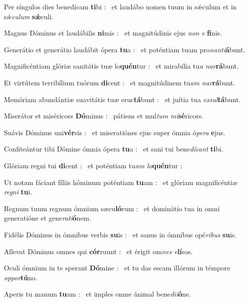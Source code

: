\documentclass[12pt]{article} %
\newenvironment{psalmtext}{\leftskip 0.25in}{\vspace{2 mm}}
\let\oldgresixstar\gresixstar
\renewcommand{\gresixstar}{\textcolor{benred8}{\oldgresixstar}}
\begin{document}
\begin{psalmtext}
Per síngulos dies benedícam \textbf{ti}bi : \gresixstar\ et laudábo nomen tuum in sǽculum et in sǽ\emph{culum} \textbf{sǽ}culi.

Magnus Dóminus et laudábilis \textbf{ni}mis : \gresixstar\ et magnitúdinis ejus \emph{non e} \textbf{fi}nis.

Generátio et generátio laudábit ópera \textbf{tu}a : \gresixstar\ et poténtiam tuam pro\emph{nunti}\textbf{á}bunt.

Magnificéntiam glóriæ sanitátis tuæ lo\textbf{quén}tur : \gresixstar\ et mirabília tu\emph{a nar}\textbf{rá}bunt.

Et virtútem terribílium tuórum \textbf{di}cent : \gresixstar\ et magnitúdinem tu\emph{am nar}\textbf{rá}bunt.

Memóriam abundántiæ suavitátis tuæ eruc\textbf{tá}bunt : \gresixstar\ et juítia tua \emph{exsul}\textbf{tá}bunt.

Miserátor et miséricors \textbf{Dó}minus : \gresixstar\ pátiens et mul\emph{tum mi}\textbf{sé}ricors.

Suávis Dóminus uni\textbf{vér}sis : \gresixstar\ et miseratiónes ejus super ómnia ó\emph{pera} \textbf{e}jus.

Confiteántur tibi Dómine ómnia ópera \textbf{tu}a : \gresixstar\ et sani tui bene\emph{dícant} \textbf{ti}bi.

Glóriam regni tui \textbf{di}cent : \gresixstar\ et poténtiam tu\emph{am lo}\textbf{quén}tur :

Ut notam fáciant fíliis hóminum poténtiam \textbf{tu}am : \gresixstar\ et glóriam magnificéntiæ \emph{regni} \textbf{tu}i.

Regnum tuum regnum ómnium sæcu\textbf{ló}rum : \gresixstar\ et dominátio tua in omni generatióne et gene\emph{rati}\textbf{ó}nem.

Fidélis Dóminus in ómnibus verbis \textbf{su}is : \gresixstar\ et sanus in ómnibus opé\emph{ribus} \textbf{su}is.

Allevat Dóminus omnes qui \textbf{cór}ruunt : \gresixstar\ et érigit om\emph{nes e}\textbf{lí}sos.

Oculi ómnium in te sperant \textbf{Dó}mine : \gresixstar\ et tu das escam illórum in témpore \emph{oppor}\textbf{tú}no.

Aperis tu manum \textbf{tu}am : \gresixstar\ et imples omne ánimal bene\emph{dii}\textbf{ó}ne.


\end{psalmtext}
\end{document}
